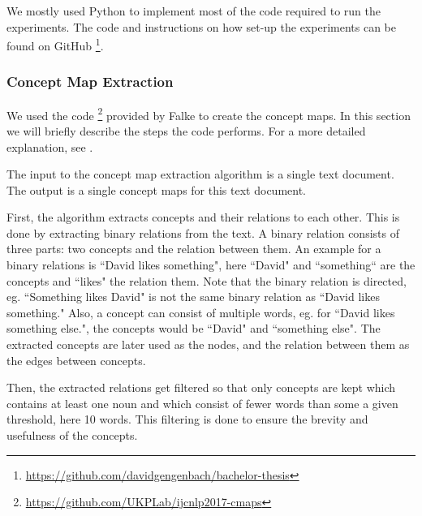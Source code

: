 We mostly used Python to implement most of the code required to run the experiments.
The code and instructions on how set-up the experiments can be found on GitHub \footnote{\url{https://github.com/davidgengenbach/bachelor-thesis}}.

\subsubsection{Concept Map Extraction}
We used the code \footnote{\url{https://github.com/UKPLab/ijcnlp2017-cmaps}} provided by Falke \cite{Falke2017} to create the concept maps.
In this section we will briefly describe the steps the code performs. For a more detailed explanation, see \cite{Falke2017}.

The input to the concept map extraction algorithm is a single text document. The output is a single concept maps for this text document.

First, the algorithm extracts concepts and their relations to each other.
This is done by extracting binary relations from the text. A binary relation consists of three parts: two concepts and the relation between them. An example for a binary relations is ``David likes something", here ``David" and ``something`` are the concepts and ``likes" the relation them. Note that the binary relation is directed, eg. ``Something likes David" is not the same binary relation as ``David likes something."
Also, a concept can consist of multiple words, eg. for ``David likes something else.", the concepts would be ``David" and ``something else".
The extracted concepts are later used as the nodes, and the relation between them as the edges between concepts.

Then, the extracted relations get filtered so that only concepts are kept which contains at least one noun and which consist of fewer words than some a given threshold, here 10 words. This filtering is done to ensure the brevity and usefulness of the concepts.